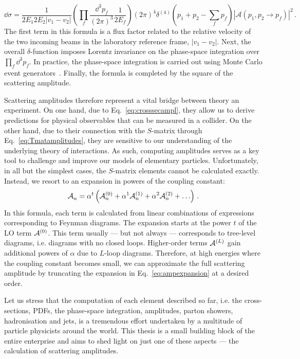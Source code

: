 \documentclass[main.tex]{subfiles}
\begin{document}
\begin{equation} \label{eq:crosssecampl}
    \dd \hat{\sigma} = \frac{1}{2E_1 2E_2 |v_1-v_2|} \left(\prod_f \frac{\dd^3 p_f}{(2\pi)^3} \frac{1}{2E_f} \right) (2\pi)^4 \delta^{(4)}\left(p_1+p_2 - \sum_f p_f\right)|\mathcal{A}(p_1,p_2 \rightarrow p_f)|^2\,.
\end{equation}
The first term in this formula is a flux factor related to the relative velocity of the two incoming beams in the laboratory reference frame, $|v_1-v_2|$. Next, the overall $\delta$-function imposes Lorentz invariance on the phase-space integration over $\prod_f \dd^3 p_f$. In practice, the phase-space integration is carried out using Monte Carlo event generators~\cite{Reuschle:2014fya, Campbell:2022qmc}. Finally, the formula is completed by the square of the scattering amplitude.

Scattering amplitudes therefore represent a vital bridge between theory an experiment. On one hand, due to Eq.~\ref{eq:crosssecampl}, they allow us to derive predictions for physical observables that can be measured in a collider. On the other hand, due to their connection with the $S$-matrix through Eq.~\ref{eq:Tmatamplitudes}, they are sensitive to our understanding of the underlying theory of interactions. As such, computing amplitudes serves as a key tool to challenge and improve our models of elementary particles. Unfortunately, in all but the simplest cases, the $S$-matrix elements cannot be calculated exactly. Instead, we resort to an expansion in powers of the coupling constant:
\begin{equation} \label{eq:ampexpansion}
    \mathcal{A}_{n}^{} = \alpha^t \left(\mathcal{A}_{n}^{(0)} + \alpha^1 \mathcal{A}_{n}^{(1)} + \alpha^2 \mathcal{A}_{n}^{(2)} + \ldots \right) \,.
\end{equation}
In this formula, each term is calculated from linear combinations of expressions corresponding to Feynman diagrams. The expansion starts at the power $t$ of the LO term $\mathcal{A}_{}^{(0)}$. This term usually --- but not always --- corresponds to tree-level diagrams, i.e. diagrams with no closed loops. Higher-order terms $\mathcal{A}_{}^{(L)}$ gain additional powers of $\alpha$ due to $L$-loop diagrams. Therefore, at high energies where the coupling constant becomes small, we can approximate the full scattering amplitude by truncating the expansion in Eq.~\ref{eq:ampexpansion} at a desired order.

Let us stress that the computation of each element described so far, i.e. the cross-sections, PDFs, the phase-space integration, amplitudes, parton showers, hadronisation and jets, is a tremendous effort undertaken by a multitude of particle physicists around the world. This thesis is a small building block of the entire enterprise and aims to shed light on just one of these aspects --- the calculation of scattering amplitudes.
\end{document}
